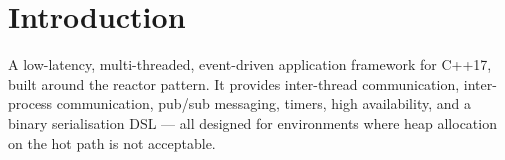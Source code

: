 \chapter{Introduction}
\label{ch:introduction}

A low-latency, multi-threaded, event-driven application framework for C++17,
built around the reactor pattern. It provides inter-thread communication,
inter-process communication, pub/sub messaging, timers, high availability, and a
binary serialisation DSL --- all designed for environments where heap allocation
on the hot path is not acceptable.
